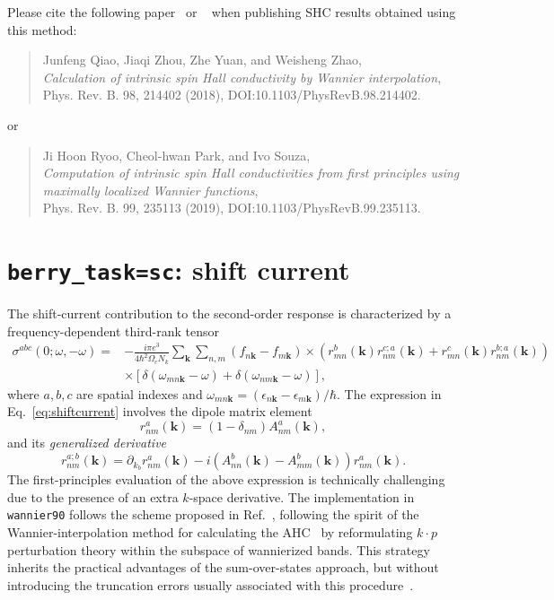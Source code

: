 Please cite the following paper~\cite{qiao-prb2018} or ~\cite{ryoo-prb2019} when publishing SHC results obtained using this method:
\begin{quote}
	Junfeng Qiao, Jiaqi Zhou, Zhe Yuan, and Weisheng Zhao, \\
	\emph{Calculation of intrinsic spin Hall conductivity by Wannier interpolation},\\
	Phys. Rev. B. 98, 214402 (2018), DOI:10.1103/PhysRevB.98.214402.
\end{quote}
or
\begin{quote}
	Ji Hoon Ryoo, Cheol-hwan Park, and Ivo Souza, \\
	\emph{Computation of intrinsic spin Hall conductivities from first principles using maximally localized Wannier functions},\\
	Phys. Rev. B. 99, 235113 (2019), DOI:10.1103/PhysRevB.99.235113.
\end{quote}

\section{{\tt berry\_task=sc}: shift current}
\label{sec:sc}

The shift-current contribution to the second-order response
is characterized by a frequency-dependent third-rank tensor~\cite{sipe-prb00}
\begin{equation}\label{eq:shiftcurrent}
\begin{split}
\sigma^{abc}(0;\omega,-\omega)=&-\frac{i\pi e^3}{4\hbar^2 \Omega_c N_k}
\sum_{\bm{k}} \sum_{n,m}(f_{n\bm{k}}-f_{m\bm{k}})
\times
\left(r^b_{ mn}(\bm{k})r^{c;a}_{nm}(\bm{k}) + r^c_{mn}(\bm{k})r^{b;a}_{ nm}(\bm{k})\right)\\
&\times \left[\delta(\omega_{mn\bm{k}}-\omega)+\delta(\omega_{nm\bm{k}}-\omega)\right],
\end{split}
\end{equation}
where $a,b,c$ are spatial indexes
and $\omega_{mn\bm{k}}=(\epsilon_{n\bm{k}}-\epsilon_{m\bm{k}})/\hbar$.
The expression in Eq.~\ref{eq:shiftcurrent} involves 
the dipole matrix element 
\begin{equation}
\label{eq:r}
r^a_{ nm}(\bm{k})=(1-\delta_{nm})A^a_{ nm}(\bm{k}),
\end{equation}
and its \emph{generalized
derivative}
%
\begin{equation}
\label{eq:gen-der}
r^{a;b}_{nm}(\bm{k})=\partial_{k_{b}} r^a_{nm}(\bm{k})
-i\left(A^b_{nn}(\bm{k})-A^b_{ mm}(\bm{k})\right)r^a_{ nm}(\bm{k}).
\end{equation}
The first-principles evaluation of the
above expression is technically challenging
due to the presence of an extra $k$-space derivative.
The implementation in {\tt wannier90} follows the scheme proposed in Ref.~\cite{ibanez-azpiroz_ab_2018}, 
following the spirit of the Wannier-interpolation 
method for calculating the AHC~\cite{wang-prb06} by reformulating $k\cdot p$
perturbation theory within the subspace of wannierized bands.
This strategy inherits the practical advantages of the sum-over-states
approach, but without introducing the truncation errors usually associated with this procedure~\cite{sipe-prb00}.

